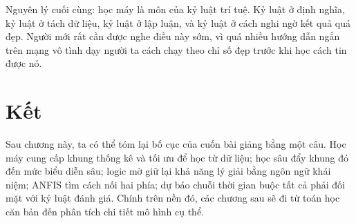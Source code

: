 Nguyên lý cuối cùng: học máy là môn của kỷ luật trí tuệ. Kỷ luật ở định nghĩa, kỷ luật ở tách dữ liệu, kỷ luật ở lập luận, và kỷ luật ở cách nghi ngờ kết quả quá đẹp. Người mới rất cần được nghe điều này sớm, vì quá nhiều hướng dẫn ngắn trên mạng vô tình dạy người ta cách chạy theo chỉ số đẹp trước khi học cách tin được nó.

\section{Kết}

Sau chương này, ta có thể tóm lại bố cục của cuốn bài giảng bằng một câu. Học máy cung cấp khung thống kê và tối ưu để học từ dữ liệu; học sâu đẩy khung đó đến mức biểu diễn sâu; logic mờ giữ lại khả năng lý giải bằng ngôn ngữ khái niệm; ANFIS tìm cách nối hai phía; dự báo chuỗi thời gian buộc tất cả phải đối mặt với kỷ luật đánh giá. Chính trên nền đó, các chương sau sẽ đi từ toán học căn bản đến phân tích chi tiết mô hình cụ thể.

